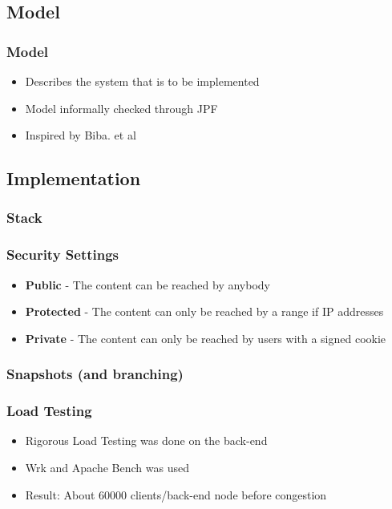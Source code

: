 \documentclass{beamer}
\begin{document}
\subsection{Model}
\begin{frame}
  \frametitle{Model}
  \begin{itemize}
    \item{Describes the system that is to be implemented}
    \pause
    \item{Model informally checked through JPF}
    \pause
    \item{Inspired by Biba. et al}
  \end{itemize}
\end{frame}

\subsection{Implementation}
\begin{frame}
  \frametitle{Stack}
  \centerline{}
\end{frame}

\begin{frame}
  \frametitle{Security Settings}
  \begin{itemize}
    \item{\textbf{Public} - The content can be reached by anybody}
    \pause
    \item{\textbf{Protected} - The content can only be reached by a range if IP addresses}
    \pause
    \item{\textbf{Private} - The content can only be reached by users with a signed cookie}
  \end{itemize}
\end{frame}

\begin{frame}
  \frametitle{Snapshots (and branching)}
  \centerline{}
\end{frame}

\begin{frame}
  \frametitle{Load Testing}
  \begin{itemize}
    \item{Rigorous Load Testing was done on the back-end}
    \pause
    \item{Wrk and Apache Bench was used}
    \pause
    \item{Result: About 60000 clients/back-end node before congestion}
  \end{itemize}
\end{frame}
\end{document}

